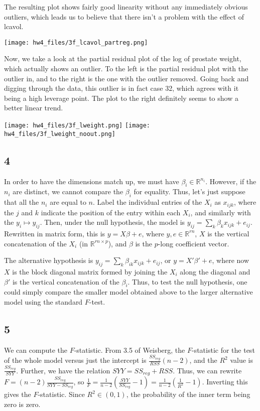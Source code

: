 \documentclass{article}
\newcommand{\rn}{\mathbb{R}}
\begin{document}
The resulting plot shows fairly good linearity without any immediately obvious outliers, which leads us to believe that there isn't a problem with the effect of lcavol.

\texttt{[image: hw4\_files/3f\_lcavol\_partreg.png]}

Now, we take a look at the partial residual plot of the log of prostate weight, which actually shows an outlier. To the left is the partial residual plot with the outlier in, and to the right is the one with the outlier removed. Going back and digging through the data, this outlier is in fact case 32, which agrees with it being a high leverage point. The plot to the right definitely seems to show a better linear trend.

\noindent\texttt{[image: hw4\_files/3f\_lweight.png]}
\texttt{[image: hw4\_files/3f\_lweight\_noout.png]}
\subsection*{4}
In order to have the dimensions match up, we must have $\beta_i\in\rn^{n_i}$. However, if the $n_i$ are distinct, we cannot compare the $\beta_i$ for equality. Thus, let's just suppose that all the $n_i$ are equal to $n$. Label the individual entries of the $X_i$ as $x_{ijk}$, where the $j$ and $k$ indicate the position of the entry within each $X_i$, and similarly with the $y_i\mapsto y_{ij}$. Then, under the null hypothesis, the model is $y_{ij}=\sum_k\beta_{k}x_{ijk}+e_{ij}$. Rewritten in matrix form, this is $y=X\beta+e$, where $y,e\in\rn^{rn}$, $X$ is the vertical concatenation of the $X_i$ (in $\rn^{rn\times p}$), and $\beta$ is the $p$-long coefficient vector. 

The alternative hypothesis is $y_{ij}=\sum_k\beta_{ik}x_{ijk}+e_{ij}$, or $y=X'\beta'+e$, where now $X$ is the block diagonal matrix formed by joining the $X_i$ along the diagonal and $\beta'$ is the vertical concatenation of the $\beta_i$. Thus, to test the null hypothesis, one could simply compare the smaller model obtained above to the larger alternative model using the standard $F$-test.
\subsection*{5}
We can compute the $F$-statistic. From 3.5 of Weisberg, the $F$-statistic for the test of the whole model versus just the intercept is $\frac{SS_{reg}}{RSS}(n-2)$, and the $R^2$ value is $\frac{SS_{reg}}{SYY}$. Further, we have the relation $SYY=SS_{reg}+RSS$. Thus, we can rewrite $F=(n-2)\frac{SS_{reg}}{SYY-SS_{reg}}$, so $\frac{1}{F}=\frac{1}{n-2}\left(\frac{SYY}{SS_{reg}}-1\right)=\frac{1}{n-2}\left(\frac{1}{R^2}-1\right)$. Inverting this gives the $F$-statistic. Since $R^2\in(0,1)$, the probability of the inner term being zero is zero.
\end{document}
